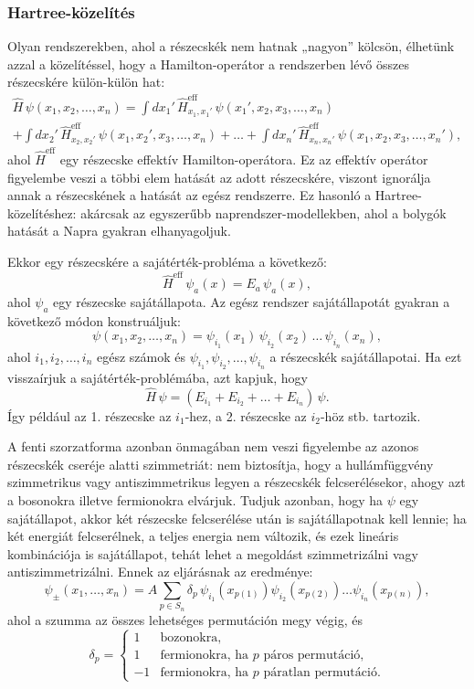 \documentclass[../main.tex]{subfiles}
\begin{document}
\subsubsection*{Hartree-közelítés}
Olyan rendszerekben, ahol a részecskék nem hatnak „nagyon” kölcsön, élhetünk azzal a közelítéssel, hogy a Hamilton-operátor a rendszerben lévő összes részecskére külön-külön hat:
\begin{multline}
\hat{H}\,\psi(x_1,x_2,\dots,x_n) = 
\int dx_1'\,\hat{H}^{\mathrm{eff}}_{x_1,x_1'}\,\psi(x_1',x_2,x_3,\dots,x_n) \\
+ \int dx_2'\,\hat{H}^{\mathrm{eff}}_{x_2,x_2'}\,\psi(x_1,x_2',x_3,\dots,x_n)
+ \dots + \int dx_n'\,\hat{H}^{\mathrm{eff}}_{x_n,x_n'}\,\psi(x_1,x_2,x_3,\dots,x_n'),
\end{multline}
ahol $\hat{H}^{\mathrm{eff}}$ egy részecske effektív Hamilton-operátora. Ez az effektív operátor figyelembe veszi a többi elem hatását az adott részecskére, viszont ignorálja annak a részecskének a hatását az egész rendszerre. Ez hasonló a Hartree-közelítéshez: akárcsak az egyszerűbb naprendszer-modellekben, ahol a bolygók hatását a Napra gyakran elhanyagoljuk.

Ekkor egy részecskére a sajátérték-probléma a következő:
\[
\hat{H}^{\mathrm{eff}}\,\psi_a(x) = E_a\,\psi_a(x),
\]
ahol $\psi_a$ egy részecske sajátállapota. Az egész rendszer sajátállapotát gyakran a következő módon konstruáljuk:
\[
\psi(x_1,x_2,\dots,x_n) = \psi_{i_1}(x_1)\,\psi_{i_2}(x_2)\,\dots\,\psi_{i_n}(x_n),
\]
ahol $i_1,i_2,\dots,i_n$ egész számok és $\psi_{i_1},\psi_{i_2},\dots,\psi_{i_n}$ a részecskék sajátállapotai. Ha ezt visszaírjuk a sajátérték-problémába, azt kapjuk, hogy
\[
\hat{H}\,\psi = (E_{i_1}+E_{i_2}+\dots+E_{i_n})\,\psi.
\]
Így például az 1. részecske az $i_1$-hez, a 2. részecske az $i_2$-höz stb. tartozik.

A fenti szorzatforma azonban önmagában nem veszi figyelembe az azonos részecskék cseréje alatti szimmetriát: nem biztosítja, hogy a hullámfüggvény szimmetrikus vagy antiszimmetrikus legyen a részecskék felcserélésekor, ahogy azt a bosonokra illetve fermionokra elvárjuk. Tudjuk azonban, hogy ha $\psi$ egy sajátállapot, akkor két részecske felcserélése után is sajátállapotnak kell lennie; ha két energiát felcserélnek, a teljes energia nem változik, és ezek lineáris kombinációja is sajátállapot, tehát lehet a megoldást szimmetrizálni vagy antiszimmetrizálni. Ennek az eljárásnak az eredménye:
\[
\psi_{\pm}(x_1,\dots,x_n) = A\sum_{p\in S_n} \delta_p\,\psi_{i_1}(x_{p(1)})\psi_{i_2}(x_{p(2)})\dots\psi_{i_n}(x_{p(n)}),
\]
ahol a szumma az összes lehetséges permutáción megy végig, és
\[
\delta_p =
\begin{cases}
1 & \text{bozonokra},\\[4pt]
1 & \text{fermionokra, ha }p\text{ páros permutáció},\\[4pt]
-1 & \text{fermionokra, ha }p\text{ páratlan permutáció}.
\end{cases}
\]
\end{document}
